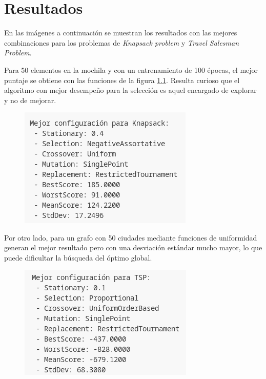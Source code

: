 \chapter{Resultados}

En las imágenes a continuación se muestran los resultados con las mejores combinaciones para los problemas de \textit{Knapsack problem} y \textit{Travel Salesman Problem}.

Para 50 elementos en la mochila y con un entrenamiento de 100 épocas, el mejor puntaje se obtiene con las funciones de la figura \ref{fig:r1}. Resulta curioso que el algoritmo con mejor desempeño para la selección es aquel encargado de explorar y no de mejorar.

\begin{figure}[H]
	\centering
	\includegraphics[width=0.45\linewidth]{img/r1.png}
	\label{fig:r1}
\end{figure}

Por otro lado, para un grafo con 50 ciudades mediante funciones de uniformidad generan el mejor resultado pero con una desviación estándar mucho mayor, lo que puede dificultar la búsqueda del óptimo global.

\begin{figure}[H]
	\centering
	\includegraphics[width=0.45\linewidth]{img/r2}
	\label{fig:r2}
\end{figure}